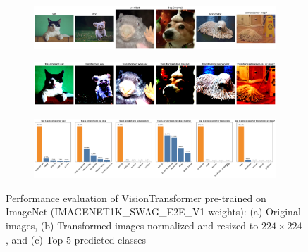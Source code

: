 \begin{figure}[H]
    \centering
    \begin{subfigure}{0.95\textwidth}
        \includegraphics[width=\textwidth]{original_images_vit_bis}
        \caption{}
        \label{subfig:original_images_vit_bis}
    \end{subfigure}
    \begin{subfigure}{0.95\textwidth}
        \includegraphics[width=\textwidth]{transformed_images_vit_bis}
        \caption{}
        \label{subfig:transformed_images_vit_bis}
    \end{subfigure}
    \begin{subfigure}{0.95\textwidth}
        \includegraphics[width=\textwidth]{prediction_plots_vit_bis}
        \caption{}
        \label{subfig:prediction_plots_vit_bis}
    \end{subfigure}
    \caption{Performance evaluation of VisionTransformer pre-trained on ImageNet (IMAGENET1K\_SWAG\_E2E\_V1 weights): (a) Original images, (b) Transformed images normalized and resized to $224 \times 224$, and (c) Top 5 predicted classes}
    \label{fig:vit_refined}
\end{figure}